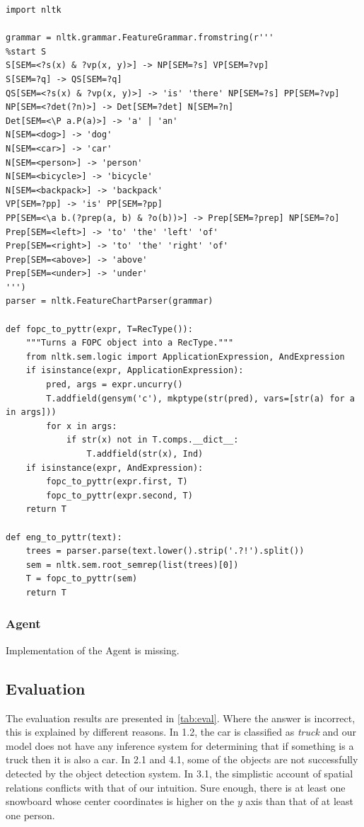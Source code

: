 \begin{lstlisting}[label=lst:grammar, caption=Basic parsing of natural language into PyTTR object]
import nltk

grammar = nltk.grammar.FeatureGrammar.fromstring(r'''
%start S
S[SEM=<?s(x) & ?vp(x, y)>] -> NP[SEM=?s] VP[SEM=?vp]
S[SEM=?q] -> QS[SEM=?q]
QS[SEM=<?s(x) & ?vp(x, y)>] -> 'is' 'there' NP[SEM=?s] PP[SEM=?vp]
NP[SEM=<?det(?n)>] -> Det[SEM=?det] N[SEM=?n]
Det[SEM=<\P a.P(a)>] -> 'a' | 'an'
N[SEM=<dog>] -> 'dog'
N[SEM=<car>] -> 'car'
N[SEM=<person>] -> 'person'
N[SEM=<bicycle>] -> 'bicycle'
N[SEM=<backpack>] -> 'backpack'
VP[SEM=?pp] -> 'is' PP[SEM=?pp]
PP[SEM=<\a b.(?prep(a, b) & ?o(b))>] -> Prep[SEM=?prep] NP[SEM=?o]
Prep[SEM=<left>] -> 'to' 'the' 'left' 'of'
Prep[SEM=<right>] -> 'to' 'the' 'right' 'of'
Prep[SEM=<above>] -> 'above'
Prep[SEM=<under>] -> 'under'
''')
parser = nltk.FeatureChartParser(grammar)

def fopc_to_pyttr(expr, T=RecType()):
    """Turns a FOPC object into a RecType."""
    from nltk.sem.logic import ApplicationExpression, AndExpression
    if isinstance(expr, ApplicationExpression):
        pred, args = expr.uncurry()
        T.addfield(gensym('c'), mkptype(str(pred), vars=[str(a) for a in args]))
        for x in args:
            if str(x) not in T.comps.__dict__:
                T.addfield(str(x), Ind)
    if isinstance(expr, AndExpression):
        fopc_to_pyttr(expr.first, T)
        fopc_to_pyttr(expr.second, T)
    return T

def eng_to_pyttr(text):
    trees = parser.parse(text.lower().strip('.?!').split())
    sem = nltk.sem.root_semrep(list(trees)[0])
    T = fopc_to_pyttr(sem)
    return T
\end{lstlisting}



\subsubsection{Agent}

Implementation of the Agent is missing.



\subsection{Evaluation}

The evaluation results are presented in \autoref{tab:eval}.
Where the answer is incorrect, this is explained by different reasons.
In 1.2, the car is classified as \textit{truck} and our model does not have any inference system for determining that if something is a truck then it is also a car.
In 2.1 and 4.1, some of the objects are not successfully detected by the object detection system.
In 3.1, the simplistic account of spatial relations conflicts with that of our intuition.
Sure enough, there is at least one snowboard whose center coordinates is higher on the $y$ axis than that of at least one person.

